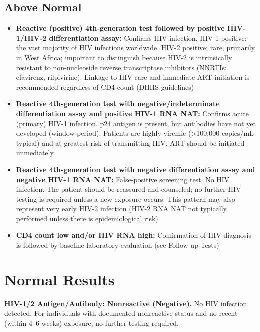 \subsection*{Above Normal}
\begin{itemize}
  \item \textbf{Reactive (positive) 4th-generation test followed by positive HIV-1/HIV-2 differentiation assay:} Confirms HIV infection. HIV-1 positive: the vast majority of HIV infections worldwide. HIV-2 positive: rare, primarily in West Africa; important to distinguish because HIV-2 is intrinsically resistant to non-nucleoside reverse transcriptase inhibitors (NNRTIs: efavirenz, rilpivirine). Linkage to HIV care and immediate ART initiation is recommended regardless of CD4 count (DHHS guidelines)
  \item \textbf{Reactive 4th-generation test with negative/indeterminate differentiation assay and positive HIV-1 RNA NAT:} Confirms acute (primary) HIV-1 infection. p24 antigen is present, but antibodies have not yet developed (window period). Patients are highly viremic (>100,000 copies/mL typical) and at greatest risk of transmitting HIV. ART should be initiated immediately
  \item \textbf{Reactive 4th-generation test with negative differentiation assay and negative HIV-1 RNA NAT:} False-positive screening test. No HIV infection. The patient should be reassured and counseled; no further HIV testing is required unless a new exposure occurs. This pattern may also represent very early HIV-2 infection (HIV-2 RNA NAT not typically performed unless there is epidemiological risk)
  \item \textbf{CD4 count low and/or HIV RNA high:} Confirmation of HIV diagnosis is followed by baseline laboratory evaluation (see Follow-up Tests)
\end{itemize}

\section*{Normal Results}
\textbf{HIV-1/2 Antigen/Antibody: Nonreactive (Negative).} No HIV infection detected. For individuals with documented nonreactive status and no recent (within 4--6 weeks) exposure, no further testing required.

